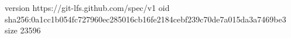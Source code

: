 version https://git-lfs.github.com/spec/v1
oid sha256:0a1cc1b054fc727960ec285016cb16fe2184cebf239c70de7a015da3a7469be3
size 23596
